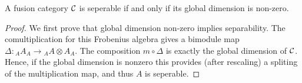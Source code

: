 \documentclass{amsart}
\begin{document}
\begin{maintheorem} \label{thm:NonzeroDimension}
A fusion category $\mathcal C$ is seperable if and only if its global dimension is non-zero.
\end{maintheorem}
\begin{proof}
We first prove that global dimension non-zero implies separability. The comultiplication for this Frobenius algebra gives a bimodule map $\Delta: {}_A A_A \rightarrow {}_A A \otimes A_A$.  The composition $m \circ \Delta$ is exactly the global dimension of $\mathcal C$.  Hence, if the global dimension is nonzero this provides (after rescaling) a spliting of the multiplication map, and thus $A$ is seperable.




\end{proof}
\end{document}
